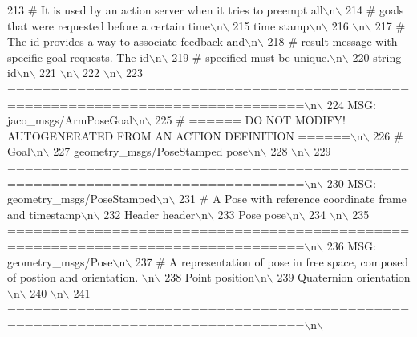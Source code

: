 \begin{DoxyCode}
213 \textcolor{stringliteral}{# It is used by an action server when it tries to preempt all\(\backslash\)n\(\backslash\)}
214 \textcolor{stringliteral}{# goals that were requested before a certain time\(\backslash\)n\(\backslash\)}
215 \textcolor{stringliteral}{time stamp\(\backslash\)n\(\backslash\)}
216 \textcolor{stringliteral}{\(\backslash\)n\(\backslash\)}
217 \textcolor{stringliteral}{# The id provides a way to associate feedback and\(\backslash\)n\(\backslash\)}
218 \textcolor{stringliteral}{# result message with specific goal requests. The id\(\backslash\)n\(\backslash\)}
219 \textcolor{stringliteral}{# specified must be unique.\(\backslash\)n\(\backslash\)}
220 \textcolor{stringliteral}{string id\(\backslash\)n\(\backslash\)}
221 \textcolor{stringliteral}{\(\backslash\)n\(\backslash\)}
222 \textcolor{stringliteral}{\(\backslash\)n\(\backslash\)}
223 \textcolor{stringliteral}{================================================================================\(\backslash\)n\(\backslash\)}
224 \textcolor{stringliteral}{MSG: jaco\_msgs/ArmPoseGoal\(\backslash\)n\(\backslash\)}
225 \textcolor{stringliteral}{# ====== DO NOT MODIFY! AUTOGENERATED FROM AN ACTION DEFINITION ======\(\backslash\)n\(\backslash\)}
226 \textcolor{stringliteral}{# Goal\(\backslash\)n\(\backslash\)}
227 \textcolor{stringliteral}{geometry\_msgs/PoseStamped pose\(\backslash\)n\(\backslash\)}
228 \textcolor{stringliteral}{\(\backslash\)n\(\backslash\)}
229 \textcolor{stringliteral}{================================================================================\(\backslash\)n\(\backslash\)}
230 \textcolor{stringliteral}{MSG: geometry\_msgs/PoseStamped\(\backslash\)n\(\backslash\)}
231 \textcolor{stringliteral}{# A Pose with reference coordinate frame and timestamp\(\backslash\)n\(\backslash\)}
232 \textcolor{stringliteral}{Header header\(\backslash\)n\(\backslash\)}
233 \textcolor{stringliteral}{Pose pose\(\backslash\)n\(\backslash\)}
234 \textcolor{stringliteral}{\(\backslash\)n\(\backslash\)}
235 \textcolor{stringliteral}{================================================================================\(\backslash\)n\(\backslash\)}
236 \textcolor{stringliteral}{MSG: geometry\_msgs/Pose\(\backslash\)n\(\backslash\)}
237 \textcolor{stringliteral}{# A representation of pose in free space, composed of postion and orientation. \(\backslash\)n\(\backslash\)}
238 \textcolor{stringliteral}{Point position\(\backslash\)n\(\backslash\)}
239 \textcolor{stringliteral}{Quaternion orientation\(\backslash\)n\(\backslash\)}
240 \textcolor{stringliteral}{\(\backslash\)n\(\backslash\)}
241 \textcolor{stringliteral}{================================================================================\(\backslash\)n\(\backslash\)}

\end{DoxyCode}
